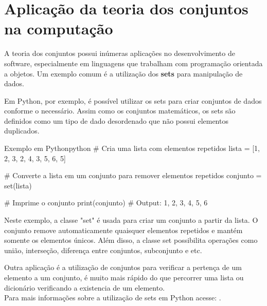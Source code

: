 \section{Aplicação da teoria dos conjuntos na computação}

A teoria dos conjuntos possui inúmeras aplicações no desenvolvimento de software, especialmente em linguagens que trabalham com programação orientada a objetos. Um exemplo comum é a utilização dos \textbf{sets} para manipulação de dados.

Em Python, por exemplo, é possível utilizar os sets para criar conjuntos de dados conforme o necessário. Assim como os conjuntos matemáticos, os sets são definidos como um tipo de dado desordenado que não possui elementos duplicados.\\

\begin{codesnip}{Exemplo em Python}{python}
# Cria uma lista com elementos repetidos
lista = [1, 2, 3, 2, 4, 3, 5, 6, 5]

# Converte a lista em um conjunto para remover elementos repetidos
conjunto = set(lista)

# Imprime o conjunto
print(conjunto)
# Output: {1, 2, 3, 4, 5, 6}
\end{codesnip}

Neste exemplo, a classe "set" é usada para criar um conjunto a partir da lista. O conjunto remove automaticamente quaisquer elementos repetidos e mantém somente os elementos únicos. Além disso, a classe set possibilita operações como união, interseção, diferença entre conjuntos, subconjunto e etc.

Outra aplicação é a utilização de conjuntos para verificar a pertença de um elemento a um conjunto, é muito mais rápido do que percorrer uma lista ou dicionário verificando a existencia de um elemento.\\

Para mais informações sobre a utilização de sets em Python acesse: . \\




